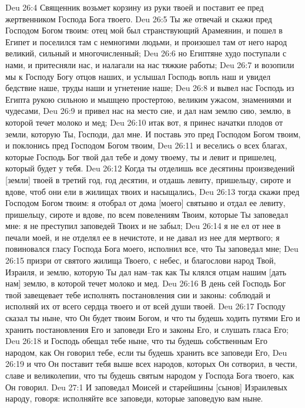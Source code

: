 Deu 26:4  Священник возьмет корзину из руки твоей и поставит ее пред жертвенником Господа Бога твоего.
Deu 26:5  Ты же отвечай и скажи пред Господом Богом твоим: отец мой был странствующий Арамеянин, и пошел в Египет и поселился там с немногими людьми, и произошел там от него народ великий, сильный и многочисленный;
Deu 26:6  но Египтяне худо поступали с нами, и притесняли нас, и налагали на нас тяжкие работы;
Deu 26:7  и возопили мы к Господу Богу отцов наших, и услышал Господь вопль наш и увидел бедствие наше, труды наши и угнетение наше;
Deu 26:8  и вывел нас Господь из Египта рукою сильною и мышцею простертою, великим ужасом, знамениями и чудесами,
Deu 26:9  и привел нас на место сие, и дал нам землю сию, землю, в которой течет молоко и мед;
Deu 26:10  итак вот, я принес начатки плодов от земли, которую Ты, Господи, дал мне. И поставь это пред Господом Богом твоим, и поклонись пред Господом Богом твоим,
Deu 26:11  и веселись о всех благах, которые Господь Бог твой дал тебе и дому твоему, ты и левит и пришелец, который будет у тебя.
Deu 26:12  Когда ты отделишь все десятины произведений [земли] твоей в третий год, год десятин, и отдашь левиту, пришельцу, сироте и вдове, чтоб они ели в жилищах твоих и насыщались,
Deu 26:13  тогда скажи пред Господом Богом твоим: я отобрал от дома [моего] святыню и отдал ее левиту, пришельцу, сироте и вдове, по всем повелениям Твоим, которые Ты заповедал мне: я не преступил заповедей Твоих и не забыл;
Deu 26:14  я не ел от нее в печали моей, и не отделял ее в нечистоте, и не давал из нее для мертвого; я повиновался гласу Господа Бога моего, исполнил все, что Ты заповедал мне;
Deu 26:15  призри от святого жилища Твоего, с небес, и благослови народ Твой, Израиля, и землю, которую Ты дал нам--так как Ты клялся отцам нашим [дать нам] землю, в которой течет молоко и мед.
Deu 26:16  В день сей Господь Бог твой завещевает тебе исполнять постановления сии и законы: соблюдай и исполняй их от всего сердца твоего и от всей души твоей.
Deu 26:17  Господу сказал ты ныне, что Он будет твоим Богом, и что ты будешь ходить путями Его и хранить постановления Его и заповеди Его и законы Его, и слушать гласа Его;
Deu 26:18  и Господь обещал тебе ныне, что ты будешь собственным Его народом, как Он говорил тебе, если ты будешь хранить все заповеди Его,
Deu 26:19  и что Он поставит тебя выше всех народов, которых Он сотворил, в чести, славе и великолепии, что ты будешь святым народом у Господа Бога твоего, как Он говорил.
Deu 27:1  И заповедал Моисей и старейшины [сынов] Израилевых народу, говоря: исполняйте все заповеди, которые заповедую вам ныне.
